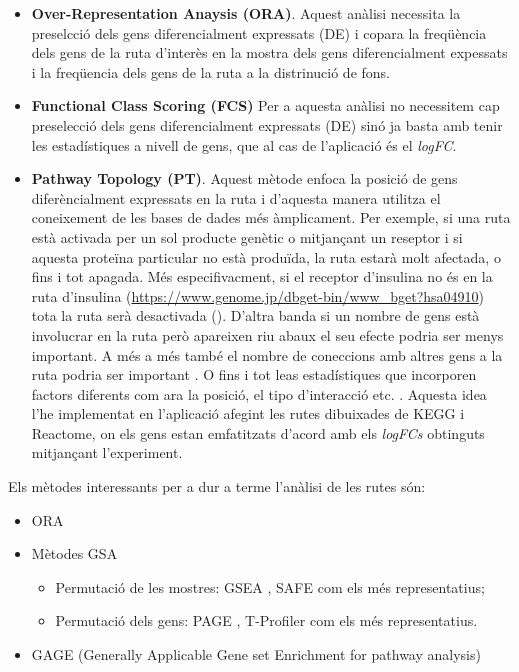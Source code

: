 \documentclass[]{article}
\begin{document}
\begin{itemize}
\item \textbf{Over-Representation Anaysis (ORA)}.
Aquest anàlisi necessita la preselcció dels gens diferencialment expressats (DE) i copara la freqüència dels gens de la ruta d'interès en la mostra dels gens diferencialment expessats i la freqüencia dels gens de la ruta a la distrinució de fons. 
\item \textbf{Functional Class Scoring (FCS)}
Per a aquesta anàlisi no necessitem cap preselecció dels gens diferencialment expressats (DE) sinó ja basta amb tenir les estadístiques a nivell de gens, que al cas de l'aplicació és el \textit{logFC}.
\item \textbf{Pathway Topology (PT)}.
Aquest mètode enfoca la posició de gens diferèncialment expressats en la ruta i d'aquesta manera utilitza el coneixement de les bases de dades més àmplicament. Per exemple, si una ruta està activada per un sol producte genètic o mitjançant un reseptor i si aquesta proteïna particular no està produïda, la ruta estarà molt afectada, o fins i tot apagada. Més especifivacment, si el receptor d'insulina no és en la ruta d'insulina (\url{https://www.genome.jp/dbget-bin/www_bget?hsa04910}) tota la ruta serà desactivada (\cite{tarca2008novel}). D'altra banda si un nombre de gens està involucrar en la ruta però apareixen riu abaux el seu efecte podria ser menys important. A més a més també el nombre de coneccions amb altres gens a la ruta podria ser important \cite{rahnenfuhrer2004calculating}. O fins i tot leas estadístiques que incorporen factors diferents com ara la posició, el tipo d'interacció etc. \cite{draghici2007systems}.  Aquesta idea l'he implementat en l'aplicació afegint les rutes dibuixades de KEGG i Reactome, on els gens estan emfatitzats d'acord amb els \textit{logFCs} obtinguts mitjançant l'experiment.


\end{itemize}

Els mètodes interessants per a dur a terme l'anàlisi de les rutes són:

\begin{itemize}
\item ORA \cite{boyle2004go}
\item Mètodes GSA
\begin{itemize} 
\item Permutació de les mostres: GSEA \cite{subramanian2005gene}, SAFE\cite{dinu2007improving} com els més representatius;
\item Permutació dels gens: PAGE \cite{kim2005page}, T-Profiler\cite{newton2007random} com els més representatius.
\end{itemize}
\item GAGE (Generally Applicable Gene set Enrichment for pathway analysis) \cite{luo2009gage}
\end{itemize}
\end{document}
